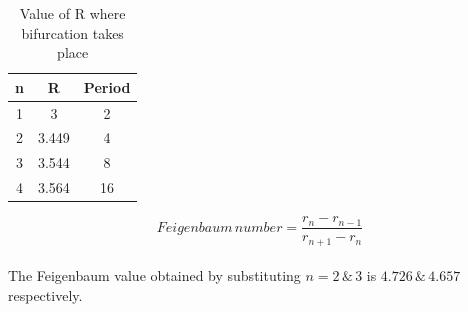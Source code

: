 \documentclass[11pt,a4paper]{article}
\begin{document}
\begin{table}[H]
\caption{Value of R where bifurcation takes place}
\centering\par\medskip
\begin{tabular}{|c|c|c|}
\hline
n & R & Period\\
\hline
1 & 3 & 2\\
2 & 3.449 & 4\\
3 & 3.544 & 8\\
4 & 3.564 & 16\\
\hline 
\end{tabular}
\end{table}

$$Feigenbaum\, number = \frac{r_{n} - r_{n-1}}{r_{n+1} - r_{n}}$$
\\
The Feigenbaum value obtained by substituting $n = 2 \,\&\, 3$ is $4.726 \,\&\, 4.657$ respectively. 
\end{document}
